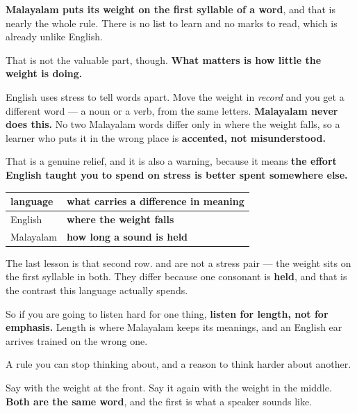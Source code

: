 \begin{grammarlens}[title={Grammar Lens: the first syllable, and nothing riding on it}]
\textbf{Malayalam puts its weight on the first syllable of a word}, and that is nearly the whole rule. There is no list to learn and no marks to read, which is already unlike English.

That is not the valuable part, though. \textbf{What matters is how little the weight is doing.}

English uses stress to tell words apart. Move the weight in \emph{record} and you get a different word — a noun or a verb, from the same letters. \textbf{Malayalam never does this.} No two Malayalam words differ only in where the weight falls, so a learner who puts it in the wrong place is \textbf{accented, not misunderstood.}

That is a genuine relief, and it is also a warning, because it means \textbf{the effort English taught you to spend on stress is better spent somewhere else.}

\noindent
\begin{tabularx}{\linewidth}{@{}>{\raggedright\arraybackslash}X>{\raggedright\arraybackslash}X@{}}
\toprule
\textbf{language} & \textbf{what carries a difference in meaning} \\
\midrule
English & \textbf{where the weight falls} \\
Malayalam & \textbf{how long a sound is held} \\
\bottomrule
\end{tabularx}

The last lesson is that second row. \textbf{} and \textbf{} are not a stress pair — the weight sits on the first syllable in both. They differ because one consonant is \textbf{held}, and that is the contrast this language actually spends.

So if you are going to listen hard for one thing, \textbf{listen for length, not for emphasis.} Length is where Malayalam keeps its meanings, and an English ear arrives trained on the wrong one.
\end{grammarlens}

\begin{grammarlens}[title={What you've built}]
A rule you can stop thinking about, and a reason to think harder about another.

Say \textbf{} with the weight at the front. Say it again with the weight in the middle. \textbf{Both are the same word}, and the first is what a speaker sounds like.
\end{grammarlens}

